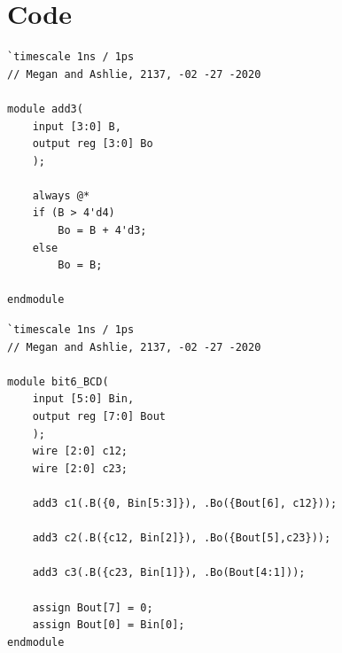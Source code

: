 \documentclass[11pt]{article}
\begin{document}
\section*{Code}
\begin{lstlisting}[style=Verilog,caption=add3 Module Code,label=code:ex ]
`timescale 1ns / 1ps
// Megan and Ashlie, 2137, -02 -27 -2020

module add3(
	input [3:0] B,
	output reg [3:0] Bo
	);
	
	always @*
	if (B > 4'd4)
		Bo = B + 4'd3;
	else
		Bo = B;

endmodule
\end{lstlisting}

\begin{lstlisting}[style=Verilog,caption=6-bit-BCD Module Code,label=code:ex ]
`timescale 1ns / 1ps
// Megan and Ashlie, 2137, -02 -27 -2020

module bit6_BCD(
	input [5:0] Bin,
	output reg [7:0] Bout
	);
	wire [2:0] c12;
	wire [2:0] c23;
	
	add3 c1(.B({0, Bin[5:3]}), .Bo({Bout[6], c12}));
	
	add3 c2(.B({c12, Bin[2]}), .Bo({Bout[5],c23}));
	
	add3 c3(.B({c23, Bin[1]}), .Bo(Bout[4:1]));
	
	assign Bout[7] = 0;
	assign Bout[0] = Bin[0];
endmodule
\end{lstlisting}
\end{document}

